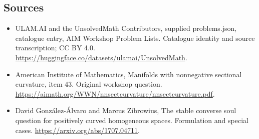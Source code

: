 \documentclass[11pt,a4paper]{article}
\begin{document}
\subsection{Sources}
\begin{itemize}
\item[S1] ULAM.AI and the UnsolvedMath Contributors, supplied problems.json, catalogue entry, AIM Workshop Problem Lists. Catalogue identity and source transcription; CC BY 4.0.
\url{https://huggingface.co/datasets/ulamai/UnsolvedMath}.
\item[S2] American Institute of Mathematics, Manifolds with nonnegative sectional curvature, item 43. Original workshop question.
\url{https://aimath.org/WWN/nnsectcurvature/nnsectcurvature.pdf}.
\item[S3] David González-Álvaro and Marcus Zibrowius, The stable converse soul question for positively curved homogeneous spaces. Formulation and special cases.
\url{https://arxiv.org/abs/1707.04711}.
\end{itemize}
\end{document}
